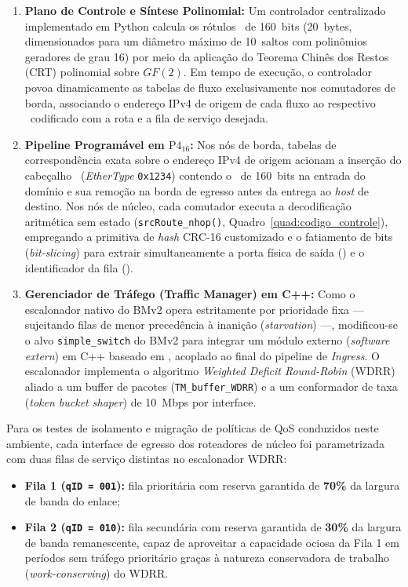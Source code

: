 \begin{enumerate}
    \item \textbf{Plano de Controle e Síntese Polinomial:} 
    Um controlador centralizado implementado em Python calcula os rótulos \routeID\ de 160~bits (20~bytes, dimensionados para um diâmetro máximo de 10~saltos com polinômios geradores de grau 16) por meio da aplicação do Teorema Chinês dos Restos (CRT) polinomial sobre $GF(2)$. Em tempo de execução, o controlador povoa dinamicamente as tabelas de fluxo exclusivamente nos comutadores de borda, associando o endereço IPv4 de origem de cada fluxo ao respectivo \routeID\ codificado com a rota e a fila de serviço desejada.
    \item \textbf{Pipeline Programável em $\text{P4}_{16}$:} 
    Nos nós de borda, tabelas de correspondência exata sobre o endereço IPv4 de origem acionam a inserção do cabeçalho \nome\ (\textit{EtherType} \texttt{0x1234}) contendo o \routeID\ de 160~bits na entrada do domínio e sua remoção na borda de egresso antes da entrega ao \textit{host} de destino. Nos nós de núcleo, cada comutador executa a decodificação aritmética sem estado (\texttt{srcRoute\_nhop()}, Quadro~\ref{quad:codigo_controle}), empregando a primitiva de \textit{hash} CRC-16 customizado e o fatiamento de bits (\textit{bit-slicing}) para extrair simultaneamente a porta física de saída (\portID) e o identificador da fila (\qID).
    \item \textbf{Gerenciador de Tráfego (Traffic Manager) em C++:} 
    Como o escalonador nativo do BMv2 opera estritamente por prioridade fixa --- sujeitando filas de menor precedência à inanição (\textit{starvation}) ---, modificou-se o alvo \texttt{simple\_switch} do BMv2 para integrar um módulo externo (\textit{software extern}) em C++ baseado em \textcite{Elbediwy2025}, acoplado ao final do pipeline de \textit{Ingress}. O escalonador implementa o algoritmo \textit{Weighted Deficit Round-Robin} (WDRR) aliado a um buffer de pacotes (\texttt{TM\_buffer\_WDRR}) e a um conformador de taxa (\textit{token bucket shaper}) de 10~Mbps por interface.
\end{enumerate}

Para os testes de isolamento e migração de políticas de QoS conduzidos neste ambiente, cada interface de egresso dos roteadores de núcleo foi parametrizada com duas filas de serviço distintas no escalonador WDRR:
\begin{itemize}
    \item \textbf{Fila 1 (\texttt{qID = 001}):} fila prioritária com reserva garantida de \textbf{70\%} da largura de banda do enlace;
    \item \textbf{Fila 2 (\texttt{qID = 010}):} fila secundária com reserva garantida de \textbf{30\%} da largura de banda remanescente, capaz de aproveitar a capacidade ociosa da Fila 1 em períodos sem tráfego prioritário graças à natureza conservadora de trabalho (\textit{work-conserving}) do WDRR.
\end{itemize}
